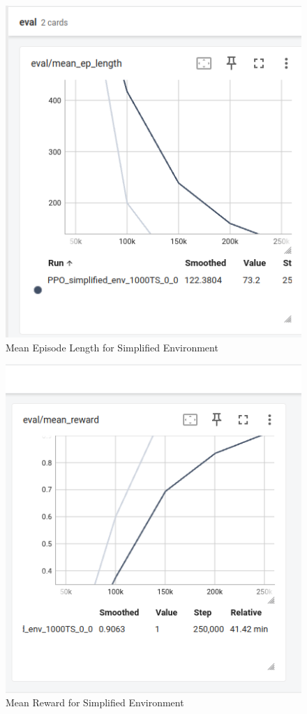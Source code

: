 \documentclass[conference]{IEEEtran}
\begin{document}
\begin{itemize}
\begin{figure}[!htb]
\centering
\includegraphics[width=0.8\columnwidth,keepaspectratio]{RL_project_update/simplified_env_episode_length.png}
\caption{Mean Episode Length for Simplified Environment}
\label{fig:your_label}
\end{figure}

\begin{figure}[!htb]
\centering
\includegraphics[width=0.8\columnwidth,keepaspectratio]{RL_project_update/simplified_env_reward.png}
\caption{Mean Reward for Simplified Environment}
\label{fig:your_label}
\end{figure}



\end{itemize}
\end{document}
